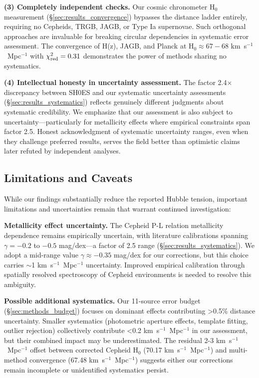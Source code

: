 \documentclass[twocolumn, linenumbers]{aastex701}
\begin{document}
\textbf{(3) Completely independent checks.} Our cosmic chronometer H$_0$ measurement (\S\ref{sec:results_convergence}) bypasses the distance ladder entirely, requiring no Cepheids, TRGB, JAGB, or Type Ia supernovae. Such orthogonal approaches are invaluable for breaking circular dependencies in systematic error assessment. The convergence of H(z), JAGB, and Planck at H$_0 \approx 67-68$ km~s$^{-1}$~Mpc$^{-1}$ with $\chi^2_{\rm red} = 0.31$ demonstrates the power of methods sharing no systematics.

\textbf{(4) Intellectual honesty in uncertainty assessment.} The factor 2.4$\times$ discrepancy between SH0ES and our systematic uncertainty assessments (\S\ref{sec:results_systematics}) reflects genuinely different judgments about systematic credibility. We emphasize that our assessment is also subject to uncertainty---particularly for metallicity effects where empirical constraints span factor 2.5. Honest acknowledgment of systematic uncertainty ranges, even when they challenge preferred results, serves the field better than optimistic claims later refuted by independent analyses.

\subsection{Limitations and Caveats}

While our findings substantially reduce the reported Hubble tension, important limitations and uncertainties remain that warrant continued investigation:

\textbf{Metallicity effect uncertainty.} The Cepheid P-L relation metallicity dependence remains empirically uncertain, with literature calibrations spanning $\gamma = -0.2$ to $-0.5$ mag/dex---a factor of 2.5 range (\S\ref{sec:results_systematics}). We adopt a mid-range value $\gamma \approx -0.35$ mag/dex for our corrections, but this choice carries $\sim$1 km~s$^{-1}$~Mpc$^{-1}$ uncertainty. Improved empirical calibration through spatially resolved spectroscopy of Cepheid environments is needed to resolve this ambiguity.

\textbf{Possible additional systematics.} Our 11-source error budget (\S\ref{sec:methods_budget}) focuses on dominant effects contributing >0.5\% distance uncertainty. Smaller systematics (photometric aperture effects, template fitting, outlier rejection) collectively contribute <0.2 km~s$^{-1}$~Mpc$^{-1}$ in our assessment, but their combined impact may be underestimated. The residual 2-3 km~s$^{-1}$~Mpc$^{-1}$ offset between corrected Cepheid H$_0$ (70.17 km~s$^{-1}$~Mpc$^{-1}$) and multi-method convergence (67.48 km~s$^{-1}$~Mpc$^{-1}$) suggests either our corrections remain incomplete or unidentified systematics persist.
\end{document}
